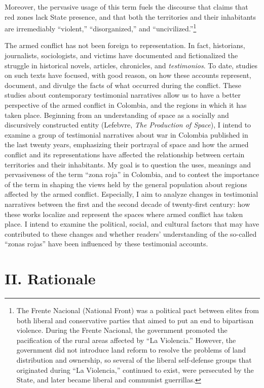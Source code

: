 \documentclass[
  11pt,
,
onecolumn,
openany
]{book}
\begin{document}
Moreover, the pervasive usage of this term fuels the discourse that claims
that red zones lack State presence, and that both the territories and their
inhabitants are irremediably ``violent,'' ``disorganized,'' and
``uncivilized.''\footnote{The Frente Nacional (National Front) was a political
  pact between elites from both liberal and conservative parties that aimed to
  put an end to bipartisan violence. During the Frente Nacional, the
  government promoted the pacification of the rural areas affected by ``La
  Violencia.'' However, the government did not introduce land reform to
  resolve the problems of land distribution and ownership, so several of the
  liberal self-defense groups that originated during ``La Violencia,''
  continued to exist, were persecuted by the State, and later became liberal
  and communist guerrillas.}

The armed conflict has not been foreign to representation. In fact,
historians, journalists, sociologists, and victims have documented and
fictionalized the struggle in historical novels, articles, chronicles, and
\emph{testimonios}. To date, studies on such texts have focused, with good
reason, on how these accounts represent, document, and divulge the facts of
what occurred during the conflict. These studies about contemporary
testimonial narratives allow us to have a better perspective of the armed
conflict in Colombia, and the regions in which it has taken place. Beginning
from an understanding of space as a socially and discursively constructed
entity (Lefebvre, \emph{The Production of Space}), I intend to examine a group
of testimonial narratives about war in Colombia published in the last twenty
years, emphasizing their portrayal of space and how the armed conflict and its
representations have affected the relationship between certain territories and
their inhabitants. My goal is to question the uses, meanings and pervasiveness
of the term ``zona roja'' in Colombia, and to contest the importance of the
term in shaping the views held by the general population about regions
affected by the armed conflict. Especially, I aim to analyze changes in
testimonial narratives between the first and the second decade of twenty-first
century: how these works localize and represent the spaces where armed
conflict has taken place. I intend to examine the political, social, and
cultural factors that may have contributed to these changes and whether
readers' understanding of the so-called ``zonas rojas'' have been influenced
by these testimonial accounts.

\hypertarget{ii.-rationale}{%
\chapter{II. Rationale}\label{ii.-rationale}}
\end{document}
